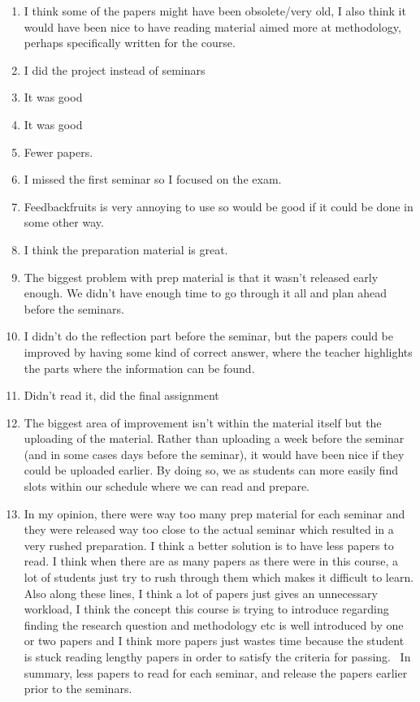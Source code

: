 \documentclass[a4paper]{report}
\begin{document}
\begin{enumerate}
  \item I think some of the papers might have been obsolete/very old, I also think it would have been nice to have reading material aimed more at methodology, perhaps specifically written for the course.
  \item I did the project instead of seminars
  \item It was good
  \item It was good
  \item Fewer papers.
  \item I missed the first seminar so I focused on the exam.
  \item Feedbackfruits is very annoying to use so would be good if it could be done in some other way.
  \item I think the preparation material is great.
  \item The biggest problem with prep material is that it wasn't released early enough. We didn't have enough time to go through it all and plan ahead before the seminars.
  \item I didn't do the reflection part before the seminar, but the papers could be improved by having some kind of correct answer, where the teacher highlights the parts where the information can be found.
  \item Didn’t read it, did the final assignment 
  \item The biggest area of improvement isn't within the material itself but the uploading of the material. Rather than uploading a week before the seminar (and in some cases days before the seminar), it would have been nice if they could be uploaded earlier. By doing so, we as students can more easily find slots within our schedule where we can read and prepare. 
  \item In my opinion, there were way too many prep material for each seminar and they were released way too close to the actual seminar which resulted in a very rushed preparation. I think a better solution is to have less papers to read. I think when there are as many papers as there were in this course, a lot of students just try to rush through them which makes it difficult to learn. Also along these lines, I think a lot of papers just gives an unnecessary workload, I think the concept this course is trying to introduce regarding finding the research question and methodology etc is well introduced by one or two papers and I think more papers just wastes time because the student is stuck reading lengthy papers in order to satisfy the criteria for passing.   In summary, less papers to read for each seminar, and release the papers earlier prior to the seminars.

\end{enumerate}
\end{document}
